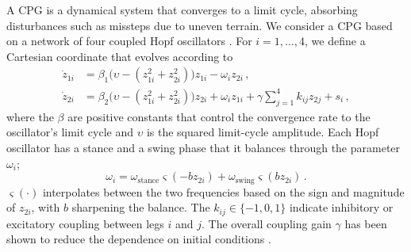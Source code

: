 \documentclass[lettersize,journal]{IEEEtran}
\begin{document}
A CPG is a dynamical system that converges to a limit cycle, absorbing disturbances such as missteps due to uneven terrain.
%
We consider a CPG based on a network of four coupled Hopf oscillators \cite{rutishauser2008passive}.  For $i = 1, \dots, 4$, we define a Cartesian coordinate that evolves according to
\begin{align}
  \dot{z}_{1i} &= \beta_1 \big(\upsilon - (z_{1i}^2 + z_{2i}^2) \big) z_{1i} - \omega_i z_{2i} \, , \label{eq:xdot} \\
  \dot{z}_{2i} &= \beta_2 \big(\upsilon - (z_{1i}^2 + z_{2i}^2) \big) z_{2i} + \omega_i z_{1i}
               + \gamma \sum_{j=1}^4 k_{ij} z_{2j} + s_i \, , \label{eq:ydot}
\end{align}
where the $\beta$ are positive constants that control the convergence rate to the oscillator's limit cycle and $\upsilon$ is the squared limit-cycle amplitude.
Each Hopf oscillator has a stance and a swing phase that it balances through the parameter $\omega_i$;
\begin{equation}
	\omega_i = \omega_{\text{stance}} \varsigma(-b z_{2i})  + \omega_{\text{swing}} \varsigma(b z_{2i}) \, . \label{eq:omega_i}
\end{equation}
$\varsigma(\cdot)$ interpolates between the two frequencies based on the sign and magnitude of $z_{2i}$, with $b$ sharpening the balance.
%
The $k_{ij} \in \{-1,0,1\}$ indicate inhibitory or excitatory coupling between legs $i$ and $j$. The overall coupling gain $\gamma$ has been shown to reduce the dependence on initial conditions \cite{rutishauser2008passive}. 
\end{document}
